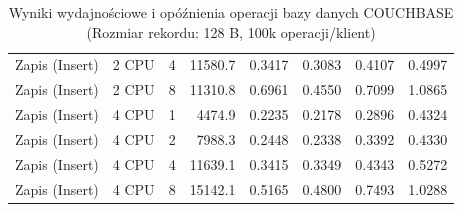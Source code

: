 \begin{table}[ht]
{\begin{tabular}{llcrrrrr}
Zapis (Insert) & 2 CPU & 4 & 11580.7 & 0.3417 & 0.3083 & 0.4107 & 0.4997 \\
Zapis (Insert) & 2 CPU & 8 & 11310.8 & 0.6961 & 0.4550 & 0.7099 & 1.0865 \\
Zapis (Insert) & 4 CPU & 1 & 4474.9 & 0.2235 & 0.2178 & 0.2896 & 0.4324 \\
Zapis (Insert) & 4 CPU & 2 & 7988.3 & 0.2448 & 0.2338 & 0.3392 & 0.4330 \\
Zapis (Insert) & 4 CPU & 4 & 11639.1 & 0.3415 & 0.3349 & 0.4343 & 0.5272 \\
Zapis (Insert) & 4 CPU & 8 & 15142.1 & 0.5165 & 0.4800 & 0.7493 & 1.0288 \\
\bottomrule
\end{tabular}%
}
\caption{Wyniki wydajnościowe i opóźnienia operacji bazy danych COUCHBASE (Rozmiar rekordu: 128 B, 100k operacji/klient)}
\label{tab:latency_couchbase_small_100000}
\end{table}
